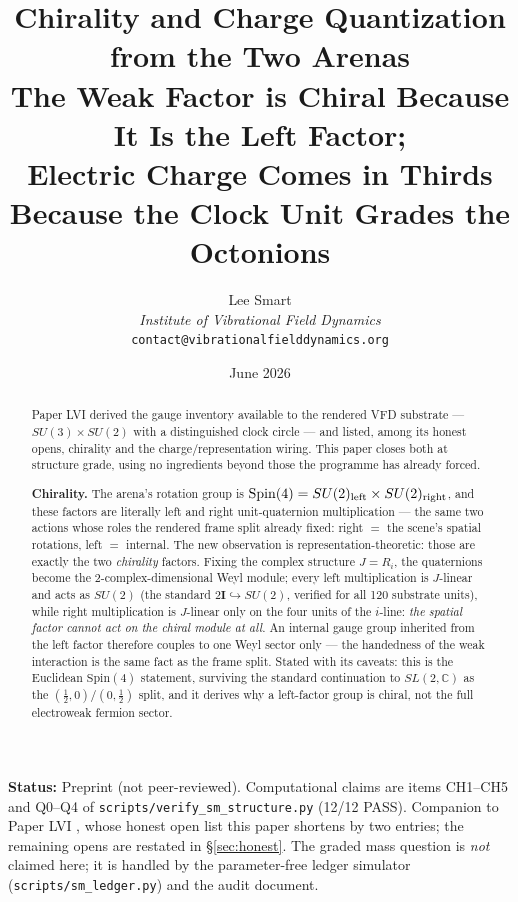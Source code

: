 \documentclass[12pt]{article}
\title{Chirality and Charge Quantization from the Two Arenas\\[6pt]
\large The Weak Factor is Chiral Because It Is the Left Factor;\\ Electric Charge Comes in Thirds Because the Clock Unit Grades the Octonions}
\author{Lee Smart\\ \textit{Institute of Vibrational Field Dynamics}\\ \texttt{contact@vibrationalfielddynamics.org}}
\date{June 2026}
\theoremstyle{definition}
\theoremstyle{remark}
\newcommand{\twoI}{2\mathbf{I}}
\begin{document}
\maketitle

\noindent\textbf{Status:} Preprint (not peer-reviewed). Computational claims are items CH1--CH5 and Q0--Q4 of \texttt{scripts/verify\_sm\_structure.py} (12/12 PASS). Companion to Paper LVI \citep{SmartLVI}, whose honest open list this paper shortens by two entries; the remaining opens are restated in \S\ref{sec:honest}. The graded mass question is \emph{not} claimed here; it is handled by the parameter-free ledger simulator (\texttt{scripts/sm\_ledger.py}) and the audit document.

\begin{abstract}
Paper LVI derived the gauge inventory available to the rendered VFD substrate --- $SU(3)\times SU(2)$ with a distinguished clock circle --- and listed, among its honest opens, chirality and the charge/representation wiring. This paper closes both at structure grade, using no ingredients beyond those the programme has already forced.

\textbf{Chirality.} The arena's rotation group is $\mathrm{Spin}(4) = SU(2)_{\rm left}\times SU(2)_{\rm right}$, and these factors are literally left and right unit-quaternion multiplication --- the same two actions whose roles the rendered frame split already fixed: right $=$ the scene's spatial rotations, left $=$ internal. The new observation is representation-theoretic: those are exactly the two \emph{chirality} factors. Fixing the complex structure $J = R_i$, the quaternions become the 2-complex-dimensional Weyl module; every left multiplication is $J$-linear and acts as $SU(2)$ (the standard $\twoI \hookrightarrow SU(2)$, verified for all 120 substrate units), while right multiplication is $J$-linear only on the four units of the $i$-line: \emph{the spatial factor cannot act on the chiral module at all}. An internal gauge group inherited from the left factor therefore couples to one Weyl sector only --- the handedness of the weak interaction is the same fact as the frame split. Stated with its caveats: this is the Euclidean $\mathrm{Spin}(4)$ statement, surviving the standard continuation to $SL(2,\mathbb C)$ as the $(\tfrac12,0)/(0,\tfrac12)$ split, and it derives why a left-factor group is chiral, not the full electroweak fermion sector.


\end{abstract}
\end{document}

